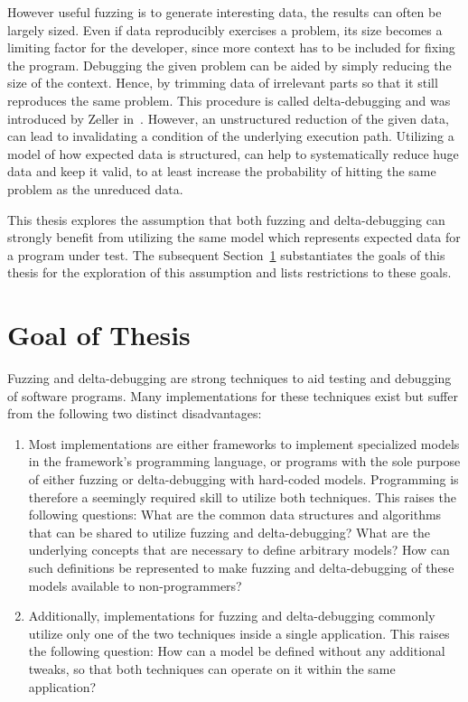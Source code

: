 However useful fuzzing is to generate interesting data, the results can often be largely sized. Even if data reproducibly exercises a problem, its size becomes a limiting factor for the developer, since more context has to be included for fixing the program. Debugging the given problem can be aided by simply reducing the size of the context. Hence, by trimming data of irrelevant parts so that it still reproduces the same problem. This procedure is called delta-debugging and was introduced by Zeller in~\cite{zeller2009programs}. However, an unstructured reduction of the given data, can lead to invalidating a condition of the underlying execution path. Utilizing a model of how expected data is structured, can help to systematically reduce huge data and keep it valid, to at least increase the probability of hitting the same problem as the unreduced data.

This thesis explores the assumption that both fuzzing and delta-debugging can strongly benefit from utilizing the same model which represents expected data for a program under test. The subsequent Section~\ref{sec:goalOfThesis} substantiates the goals of this thesis for the exploration of this assumption and lists restrictions to these goals.

\section{Goal of Thesis}
\label{sec:goalOfThesis}

Fuzzing and delta-debugging are strong techniques to aid testing and debugging of software programs. Many implementations for these techniques exist but suffer from the following two distinct disadvantages:

\begin{enumerate}
\item Most implementations are either frameworks to implement specialized models in the framework's programming language, or programs with the sole purpose of either fuzzing or delta-debugging with hard-coded models. Programming is therefore a seemingly required skill to utilize both techniques. This raises the following questions: What are the common data structures and algorithms that can be shared to utilize fuzzing and delta-debugging? What are the underlying concepts that are necessary to define arbitrary models? How can such definitions be represented to make fuzzing and delta-debugging of these models available to non-programmers?
\item Additionally, implementations for fuzzing and delta-debugging commonly utilize only one of the two techniques inside a single application. This raises the following question: How can a model be defined without any additional tweaks, so that both techniques can operate on it within the same application?
\end{enumerate}

